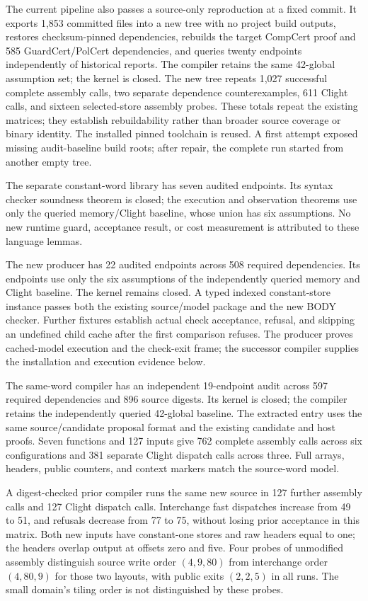 The current pipeline also passes a source-only reproduction at a fixed commit.
It exports 1,853 committed files into a new tree with no project build outputs,
restores checksum-pinned dependencies, rebuilds the target CompCert proof and
585 GuardCert/PolCert dependencies, and queries twenty endpoints independently
of historical reports. The compiler retains the same 42-global assumption set;
the kernel is closed. The new tree repeats 1,027 successful complete assembly
calls, two separate dependence counterexamples, 611 Clight calls, and sixteen
selected-store assembly probes. These totals repeat the existing matrices;
they establish rebuildability rather than broader source coverage or binary
identity. The installed pinned toolchain is reused. A first attempt exposed
missing audit-baseline build roots; after repair, the complete run started from
another empty tree.

The separate constant-word library has seven audited endpoints. Its syntax
checker soundness theorem is closed; the execution and observation theorems use
only the queried memory/Clight baseline, whose union has six assumptions.
No new runtime guard, acceptance result, or cost measurement is attributed to
these language lemmas.

The new producer has 22 audited endpoints across 508 required dependencies.
Its endpoints use only the six assumptions of the independently queried memory
and Clight baseline. The kernel remains closed. A typed indexed constant-store
instance passes both the existing source/model package
and the new BODY checker. Further fixtures establish actual check acceptance,
refusal, and skipping an undefined child cache after the first comparison
refuses. The producer proves cached-model execution and the check-exit frame;
the successor compiler supplies the installation and execution evidence below.

The same-word compiler has an independent 19-endpoint audit across 597 required
dependencies and 896 source digests. Its kernel is closed; the compiler retains
the independently queried 42-global baseline. The extracted entry uses the same
source/candidate proposal format and the existing candidate and host proofs.
Seven functions and 127 inputs give 762 complete assembly calls across six
configurations and 381 separate Clight dispatch calls across three. Full arrays,
headers, public counters, and context markers match the source-word model.

A digest-checked prior compiler runs the same new source in 127 further assembly
calls and 127 Clight dispatch calls. Interchange fast dispatches increase from
49 to 51, and refusals decrease from 77 to 75, without losing prior acceptance
in this matrix. Both new inputs have constant-one stores and raw headers equal
to one; the headers overlap output at offsets zero and five. Four probes of
unmodified assembly distinguish source write order $(4,9,80)$ from interchange
order $(4,80,9)$ for those two layouts, with public exits $(2,2,5)$ in all runs.
The small domain's tiling order is not distinguished by these probes.

